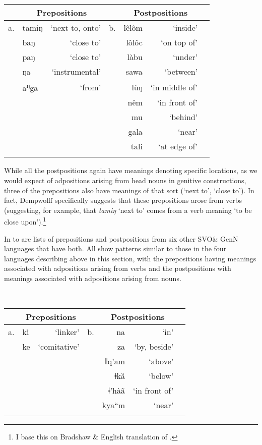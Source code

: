 \documentclass[output=paper]{langsci/langscibook}
\begin{document}
\begin{table}
\begin{tabularx}{\textwidth}{Xlrrrrr} 
\lsptoprule
 & \multicolumn{2}{c}{\bfseries Prepositions} &  & \multicolumn{2}{c}{\bfseries Postpositions}\\
\midrule
a. & tamiŋ & ‘next to, onto’ & b. & lêlôm & ‘inside’\\
 & baŋ & ‘close to’ &  & lôlôc & ‘on top of’\\
 & paŋ & ‘close to’ &  & làbu & ‘under’\\
 & ŋa & ‘instrumental’ &  & sawa & ‘between’\\
 & a\textsuperscript{ŋ}ga & ‘from’ &  & lùŋ & ‘in middle of’\\
 &  &  &  & nêm & ‘in front of’\\
 &  &  &  & mu & ‘behind’\\
 &  &  &  & gala & ‘near’\\
 &  &  &  & tali & ‘at edge of’\\
\lspbottomrule
\end{tabularx}
\end{table}

While all the postpositions again have meanings denoting specific locations, as we would expect of adpositions arising from head nouns in genitive constructions, three of the prepositions also have meanings of that sort (‘next to’, ‘close to’). In fact, Dempwolff specifically suggests that these prepositions arose from verbs (suggesting, for example, that \textit{tamiŋ} ‘next to’ comes from a verb meaning ‘to be close upon’).\footnote{I base this on Bradshaw \&  English translation of \citet{Dempwolff1939}.}

In  to  are lists of prepositions and postpositions from six other SVO\& GenN languages that have both. All show patterns similar to those in the four languages describing above in this section, with the prepositions having meanings associated with adpositions arising from verbs and the postpositions with meanings associated with adpositions arising from nouns.

\begin{table}
\\

\begin{tabularx}{\textwidth}{Xlrrrrr}
\lsptoprule
 & \multicolumn{2}{c}{\bfseries Prepositions} &  & \multicolumn{2}{c}{\bfseries Postpositions}\\
\midrule
a. & kì & ‘linker’ & b. & na & ‘in’\\
 & ke & ‘comitative’ &  & za & ‘by, beside’\\
 &  &  &  & ǀǀq'am & ‘above’\\
 &  &  &  & ǂkȁ & ‘below’\\
 &  &  &  & ǂ’hàã & ‘in front of’\\
 &  &  &  & kya“m & ‘near’\\
\lspbottomrule
\end{tabularx}
\end{table}
\end{document}
